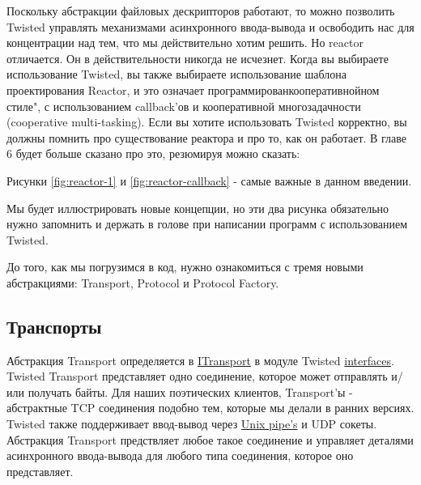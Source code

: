 Поскольку абстракции файловых дескрипторов работают, 
то можно позволить Twisted 
управлять механизмами асинхронного ввода-вывода и освободить  
нас для концентрации над тем, что мы действительно хотим 
решить. Но reactor отличается. Он в действительности никогда 
не исчезнет. Когда вы выбираете использование Twisted, 
вы также выбираете использование шаблона проектирования Reactor, 
и это означает программированкооперативнойном стиле", 
с использованием callback'ов и кооперативной многозадачности 
(cooperative multi-tasking). Если вы хотите использовать 
Twisted корректно, вы должны помнить про существование реактора  и 
про то, как он работает. В главе 6 будет больше сказано про это, резюмируя 
можно сказать:

Рисунки \ref{fig:reactor-1} и \ref{fig:reactor-callback} - самые 
важные в данном введении. 


Мы будет иллюстрировать новые концепции, но эти 
два рисунка обязательно нужно запомнить и держать в голове 
при написании программ с использованием Twisted.

До того, как мы погрузимся в код, нужно ознакомиться с тремя 
новыми абстракциями: Transport, Protocol и Protocol Factory.


\subsection{Транспорты}


Абстракция Transport определяется в 
\href{http://twistedmatrix.com/trac/browser/tags/releases/twisted-8.2.0/twisted/internet/interfaces.py#L1289}{ITransport} 
в модуле Twisted \href{http://twistedmatrix.com/trac/browser/tags/releases/twisted-8.2.0/twisted/internet/interfaces.py}{interfaces}. Twisted Transport представляет одно соединение, которое 
может отправлять и/или получать байты. Для наших поэтических клиентов, 
Transport'ы - абстрактные TCP соединения подобно тем, которые мы делали в 
ранних версиях. Twisted также поддерживает ввод-вывод через 
\href{http://en.wikipedia.org/wiki/Unix\_pipe#Network\_pipes}{Unix pipe's} 
и UDP сокеты. Абстракция Transport предствляет любое такое 
соединение и управляет деталями асинхронного ввода-вывода для 
любого типа соединения, которое оно представляет.


